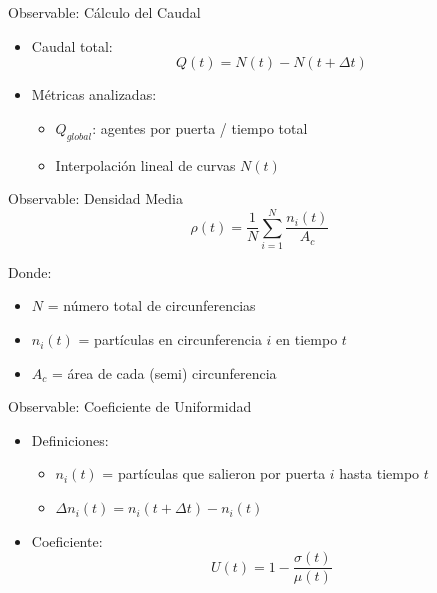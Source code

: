 \documentclass[aspectratio=169]{beamer}
\begin{document}
\begin{frame}{Observable: Cálculo del Caudal}
    \begin{itemize}
        \item Caudal total:
        \begin{equation}
            Q(t) = N(t) - N(t + \Delta t)
        \end{equation}
        \item Métricas analizadas:
        \begin{itemize}
            \item $Q_{global}$: agentes por puerta / tiempo total
            \item Interpolación lineal de curvas $N(t)$
        \end{itemize}
    \end{itemize}
\end{frame}

\begin{frame}{Observable: Densidad Media}
    \begin{equation}
        \rho(t) = \frac{1}{N} \sum_{i=1}^{N} \frac{n_i(t)}{A_c}
    \end{equation}
    
    Donde:
    \begin{itemize}
        \item $N$ = número total de circunferencias
        \item $n_i(t)$ = partículas en circunferencia $i$ en tiempo $t$
        \item $A_c$ = área de cada (semi) circunferencia
    \end{itemize}
\end{frame}

\begin{frame}{Observable: Coeficiente de Uniformidad}
    \begin{itemize}
        \item Definiciones:
        \begin{itemize}
            \item $n_i(t)$ = partículas que salieron por puerta $i$ hasta tiempo $t$
            \item $\Delta n_i(t) = n_i(t + \Delta t) - n_i(t)$
        \end{itemize}
        \item Coeficiente:
        \begin{equation}
            U(t) = 1 - \frac{\sigma(t)}{\mu(t)}
        \end{equation}
    \end{itemize}
\end{frame}
\end{document}
